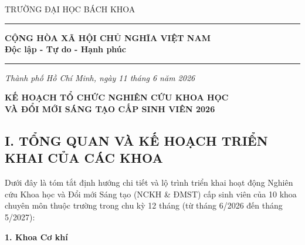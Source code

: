 \documentclass[11pt,a4paper]{article}
\begin{document}
\noindent
\begin{minipage}[t]{0.45\textwidth}
\begin{center}
    \fontsize{11pt}{13pt}\selectfont TRƯỜNG ĐẠI HỌC BÁCH KHOA \\
    \vspace{0.15cm}
    \rule{3.2cm}{0.5pt}
\end{center}
\end{minipage}
\hfill
\begin{minipage}[t]{0.5\textwidth}
\begin{center}
    \fontsize{11pt}{13pt}\selectfont \textbf{CỘNG HÒA XÃ HỘI CHỦ NGHĨA VIỆT NAM} \\
    \vspace{0.1cm}
    \fontsize{11pt}{13pt}\selectfont \textbf{Độc lập - Tự do - Hạnh phúc} \\
    \vspace{0.05cm}
    \rule{4cm}{0.5pt}
\end{center}
\end{minipage}

\vspace{0.4cm}
\begin{flushright}
    \textit{Thành phố Hồ Chí Minh, ngày 11 tháng 6 năm 2026}
\end{flushright}

\vspace{0.6cm}
\begin{center}
    \fontsize{12pt}{14pt}\selectfont \textbf{KẾ HOẠCH TỔ CHỨC NGHIÊN CỨU KHOA HỌC} \\
    \vspace{0.15cm}
    \fontsize{12pt}{14pt}\selectfont \textbf{VÀ ĐỔI MỚI SÁNG TẠO CẤP SINH VIÊN 2026}
\end{center}

\vspace{0.5cm}

\subsection{I. TỔNG QUAN VÀ KẾ HOẠCH TRIỂN KHAI CỦA CÁC
KHOA}\label{i.-tux1ed5ng-quan-vuxe0-kux1ebf-houx1ea1ch-triux1ec3n-khai-cux1ee7a-cuxe1c-khoa}

Dưới đây là tóm tắt định hướng chi tiết và lộ trình triển khai hoạt động
Nghiên cứu Khoa học và Đổi mới Sáng tạo (NCKH \& ĐMST) cấp sinh viên của
10 khoa chuyên môn thuộc trường trong chu kỳ 12 tháng (từ tháng 6/2026
đến tháng 5/2027):

\textbf{1. Khoa Cơ khí}
\end{document}
